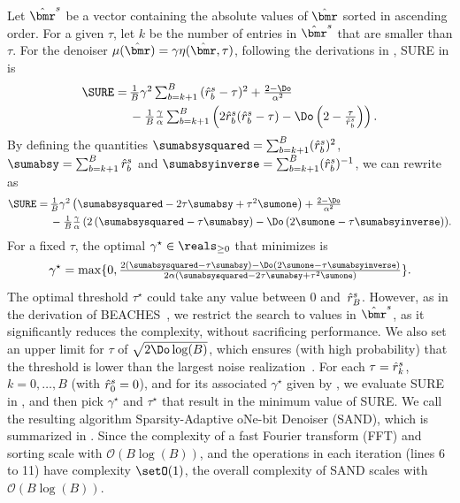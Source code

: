 %
Let $\rshat$ be a vector containing the absolute values of $\rhat$ sorted in ascending order. For a given $\tau$, let $k$ be the number of entries in $\rshat$ that are smaller than $\tau$.
For the denoiser $\mur = \gamma\eta(\rhat,\tau)$, following the derivations in \cite[App.~B]{ghods19a}, SURE in  is 
\begin{align} \label{eq:SureShrink1}
\SURE = \, & \textstyle \frac{1}{B} \gamma^2\sum_{b=k+1}^{B}{(\rshate{b}-\tau)^2} + \frac{2-\Do}{\alpha^2} \\
& - \textstyle \frac{1}{B} \frac{\gamma}{\alpha}\sum_{b=k+1}^{B}\left({{2}{\rshate{b}(\rshate{b}-\tau)}}-{\Do}\left(2-\textstyle\frac{\tau}{\rshate{b}}\right)\right) \notag.
\end{align}
%
By defining the quantities $\sumabsysquared = \sum_{b=k+1}^{B} (\rshate{b})^2$, $\sumabsy = \sum_{b=k+1}^{B} \rshate{b}$ and $\sumabsyinverse = \sum_{b=k+1}^{B} (\rshate{b})^{-1}$, we can rewrite  as
\begin{align} 
\SURE = \, & \textstyle \frac{1}{B}\gamma^2\left(\sumabsysquared-2\tau\sumabsy+\tau^2\sumone\right) + \frac{2-\Do}{\alpha^2} \notag \\
& - \textstyle \frac{1}{B}\frac{\gamma}{\alpha}\left(2\left(\sumabsysquared-\tau\sumabsy\right)  
- \Do\left(2\sumone-\tau\sumabsyinverse\right)\right)\!.
\label{eq:SureShrinkabc}
\end{align}
%
For a fixed $\tau$, the optimal $\gamma^\star\in\reals_{\geq0}$ that minimizes  is%
\begin{align} \label{eq:gammastar}
\gamma^\star = \max\{0,\textstyle \frac{2\left(\sumabsysquared-\tau\sumabsy\right)  
	- \Do\left(2\sumone-\tau\sumabsyinverse\right)}{2\alpha\left(\sumabsysquared-2\tau\sumabsy+\tau^2\sumone\right)}\}.
\end{align}
%
The optimal threshold $\tau^\star$ could take any value between $0$ and~$\hat{r}^s_{B}$. However, as in the derivation of BEACHES~\cite{mirfarshbafan19a}, we restrict the search to values in $\rshat$, as it significantly reduces the complexity, without sacrificing performance. We also set an upper limit for $\tau$ of $\sqrt{2\Do\log(B)}$, which ensures (with high probability) that the threshold is lower than the largest noise realization~\cite{donoho95}.
%
For each $\tau = \hat{r}^s_{k}$, $k = 0,\ldots,B$ (with $\hat{r}^s_{0} = 0$), and for its associated $\gamma^\star$ given by , we evaluate SURE in , and then pick $\gamma^\star$ and $\tau^\star$ that result in the minimum value of SURE. We call the resulting algorithm Sparsity-Adaptive oNe-bit Denoiser (SAND), which is summarized in . 
Since the complexity of a fast Fourier transform (FFT) and sorting scale with $\mathcal{O}(B\log(B))$, and the operations in each iteration (lines 6 to 11) have complexity $\setO(1)$, the overall complexity of SAND scales with $\mathcal{O}(B\log(B))$.

